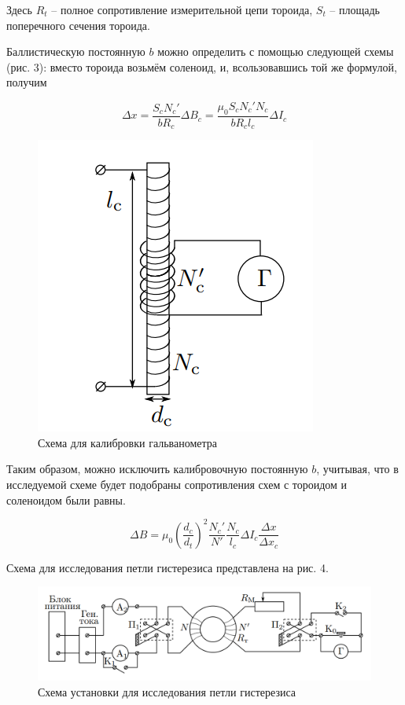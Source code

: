 Здесь $R_t$ -- полное сопротивление измерительной цепи тороида, $S_{t}$ -- площадь поперечного сечения тороида.

Баллистическую постоянную $b$ можно определить с помощью следующей схемы (рис. 3): вместо тороида возьмём соленоид, и, всользовавшись той же формулой, получим

\begin{equation}
    \Delta x = \frac{S_c N_c'}{bR_c} \Delta B_c = \frac{\mu_0 S_c N_c' N_c}{b R_c l_c} \Delta I_c
\end{equation}

\begin{figure}[h]
    \centering
    \includegraphics[width = 6 cm]{images/3.png}
    \caption{Схема для калибровки
    гальванометра}
    \label{kalibr}
\end{figure}

Таким образом, можно исключить калибровочную постоянную $b$, учитывая, что в исследуемой схеме будет подобраны сопротивления схем с тороидом и соленоидом были равны.

\begin{equation}
    \label{eq:B}
    \Delta B = \mu_0 \left(\frac{d_c}{d_t}\right)^2 \frac{N_{c}'}{N'} \frac{N_{c}}{l_c} \Delta I_c \frac{\Delta x}{\Delta x_c}
\end{equation}

Схема для исследования петли гистерезиса представлена на рис. 4.

\begin{figure}[h]
    \centering
    \includegraphics[width = 13 cm]{images/4.png}
    \caption{Схема установки для исследования петли гистерезиса}
    \label{}
\end{figure}

